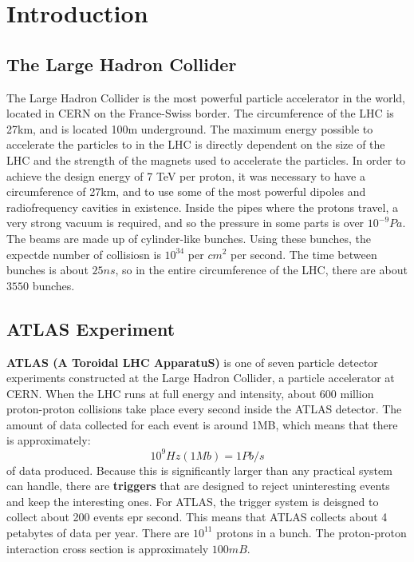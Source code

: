 \chapter{Introduction}
\section{The Large Hadron Collider}
The Large Hadron Collider is the most powerful particle accelerator in the world, located in CERN on the France-Swiss border.
The circumference of the LHC is 27km, and is located 100m underground. 
The maximum energy possible to accelerate the particles to in the LHC is directly dependent on the size of the LHC and the strength of the magnets used to accelerate the particles. 
In order to achieve the design energy of 7 TeV per proton, it was necessary to have a circumference of 27km, and to use some of the most powerful dipoles and radiofrequency cavities in existence. 
Inside the pipes where the protons travel, a very strong vacuum is required, and so the pressure in some parts is over $10^{-9}Pa$. 
The beams are made up of cylinder-like bunches. 
Using these bunches, the expectde number of collisiosn is $10^{34}$ per $cm^2$ per second. 
The time between bunches is about $25ns$, so in the entire circumference of the LHC, there are about $3550$ bunches.
\section{ATLAS Experiment}
\textbf{ATLAS (A Toroidal LHC ApparatuS)} is one of seven particle detector experiments constructed at the Large Hadron Collider, a particle accelerator at CERN. 
When the LHC runs at full energy and intensity, about 600 million proton-proton collisions take place every second inside the ATLAS detector. 
The amount of data collected for each event is around 1MB, which means that there is approximately:
$$10^9Hz(1Mb)=1Pb/s$$
of data produced. 
Because this is significantly larger than any practical system can handle, there are \textbf{triggers} that are designed to reject uninteresting events and keep the interesting ones. 
For ATLAS, the trigger system is deisgned to collect about 200 events epr second. 
This means that ATLAS collects about 4 petabytes of data per year. 
There are $10^{11}$ protons in a bunch. 
The proton-proton interaction cross section is approximately $100mB$.


